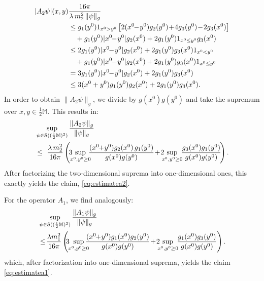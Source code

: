 \documentclass[b5paper,draft,openbib,12pt]{memoir}
\newcommand{\M}{\mathbb{M}}
\begin{document}
\begin{align}
  |A_2 \psi|(x,y)& \frac{16\pi}{\lambda \, m_2^2 \, \| \psi \|_g} \notag\\
  &\leq g_1(y^0) 1_{x^0>y^0} \left[ 2(x^0\!\!-\!y^0)g_2(y^0) \!+\! 4 g_3(y^0)\!-\!2g_3(x^0) \right]\nonumber\\
&~~~+g_1(y^0) |x^0\!\!-\!y^0| g_2(x^0) + 2 g_1(y^0) 1_{x^0\le y^0} g_3(x^0)\nonumber\\
&\leq 2g_1(y^0)|x^0\!\!-\!y^0| g_2(x^0) + 2 g_1(y^0)g_3(x^0) 1_{x^0<y^0}\nonumber\\
&~~~+g_1(y^0)|x^0\!\!-\!y^0|g_2(x^0) + 2 g_1(y^0) g_3(x^0) 1_{x^0\le y^0}\nonumber\\
&= 3g_1(y^0)|x^0\!\!-\!y^0| g_2(x^0) + 2 g_1(y^0)g_3(x^0)\nonumber\\
&\leq 3(x^0+y^0)g_1(y^0) g_2(x^0) + 2 g_1(y^0)g_3(x^0).
\end{align}
In order to obtain $\| A_2 \psi \|_g$, we divide by 
$g(x^0)g(y^0)$ and take 
the supremum over $x,y \in \tfrac{1}{2}\M$. This results in:
\begin{align}
  &\sup_{\psi \in \mathcal{S}((\frac{1}{2}\M)^2)} \frac{\| A_2 \psi \|_g}{\| \psi \|_g} \\
  &\leq~ \frac{\lambda \, m_2^2}{16\pi} \left( \!3\!\!\!\sup_{x^0,y^0 \geq 0}\!\!\! \frac{(x^0\!\!+\!y^0)g_2(x^0)\, g_1(y^0)}{g(x^0)g(y^0)}  \!+\! 2\!\!\! \sup_{x^0,y^0\geq 0}\!\! \frac{g_3(x^0)g_1(y^0)}{g(x^0)g(y^0)}\!\right).\notag
\end{align}
After factorizing the two-dimensional suprema 
into one-dimensional ones, 
this exactly yields the claim, \eqref{eq:estimatea2}.

For the operator $A_1$, we find analogously:
\begin{align}
  &\sup_{\psi \in \mathcal{S}((\frac{1}{2}\M)^2)} \frac{\| A_1 \psi \|_g}{\| \psi \|_g} \notag\\
  &\leq\! \frac{\lambda m_1^2}{16\pi} \left(\!\! 3\!\!\sup_{x^0,y^0 \geq 0}\!\!\!\! \frac{(x^0\!\!+\!y^0)g_1(x^0) g_2(y^0)}{g(x^0)g(y^0)}  
  \!+\! 2\!\!\! \sup_{x^0,y^0\geq 0}\!\! \frac{g_1(x^0)g_3(y^0)}{g(x^0)g(y^0)}\right).
\end{align}
which, after factorization into one-dimensional suprema, yields 
the claim 
\eqref{eq:estimatea1}.


\end{document}
